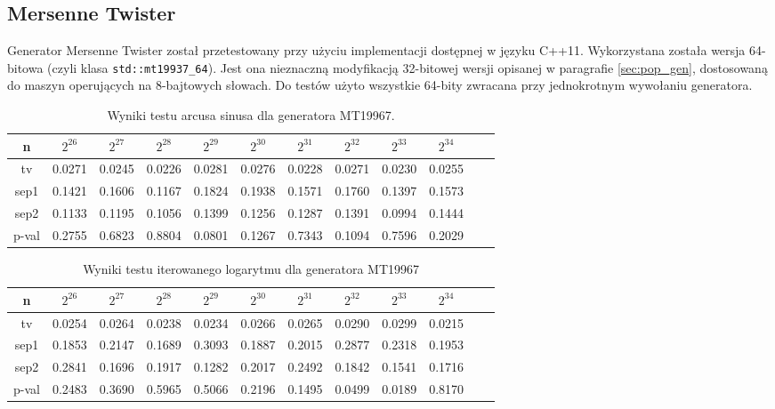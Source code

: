 \documentclass[a4paper,11pt,twoside]{book}
\theoremstyle{definition}
\begin{document}
\subsection{Mersenne Twister}
Generator Mersenne Twister został przetestowany przy użyciu implementacji dostępnej w języku C++11. Wykorzystana została wersja 64-bitowa (czyli klasa \texttt{std::mt19937\_64}). Jest ona nieznaczną modyfikacją 32-bitowej wersji opisanej w paragrafie \ref{sec:pop_gen}, dostosowaną do maszyn operujących na 8-bajtowych słowach. Do testów użyto wszystkie 64-bity zwracana przy jednokrotnym wywołaniu generatora.

\begin{table}[ht!]
\centering
 \caption{Wyniki testu arcusa sinusa dla generatora MT19967.}
 \label{tab:twister_asin}
\begin{tabular} {||c|c|c|c|c|c|c|c|c|c|c|c||}  
 \hline
     n &  $2^{26}$ &  $2^{27}$ &  $2^{28}$ &  $2^{29}$ &  $2^{30}$ &  $2^{31}$ &  $2^{32}$ &  $2^{33}$ &  $2^{34}$\\ \hline
     tv &  0.0271 &  0.0245 &  0.0226 &  0.0281 &  0.0276 &  0.0228 &  0.0271 &  0.0230 &  0.0255\\ \hline
   sep1 &  0.1421 &  0.1606 &  0.1167 &  0.1824 &  0.1938 &  0.1571 &  0.1760 &  0.1397 &  0.1573\\ \hline
   sep2 &  0.1133 &  0.1195 &  0.1056 &  0.1399 &  0.1256 &  0.1287 &  0.1391 &  0.0994 &  0.1444\\ \hline
  p-val &  0.2755 &  0.6823 &  0.8804 &  0.0801 &  0.1267 &  0.7343 &  0.1094 &  0.7596 &  0.2029\\ \hline
\end{tabular}  
\end{table}
\begin{table}[ht!]
\centering
 \caption{Wyniki testu iterowanego logarytmu dla generatora MT19967}
 \label{tab:twister_lil}
\begin{tabular} {||c|c|c|c|c|c|c|c|c|c|c|c||}  
 \hline 
     n &  $2^{26}$ &  $2^{27}$ &  $2^{28}$ &  $2^{29}$ &  $2^{30}$ &  $2^{31}$ &  $2^{32}$ &  $2^{33}$ &  $2^{34}$\\ \hline
     tv &  0.0254 &  0.0264 &  0.0238 &  0.0234 &  0.0266 &  0.0265 &  0.0290 &  0.0299 &  0.0215\\ \hline
   sep1 &  0.1853 &  0.2147 &  0.1689 &  0.3093 &  0.1887 &  0.2015 &  0.2877 &  0.2318 &  0.1953\\ \hline
   sep2 &  0.2841 &  0.1696 &  0.1917 &  0.1282 &  0.2017 &  0.2492 &  0.1842 &  0.1541 &  0.1716\\ \hline
  p-val &  0.2483 &  0.3690 &  0.5965 &  0.5066 &  0.2196 &  0.1495 &  0.0499 &  0.0189 &  0.8170\\ \hline
\end{tabular}  
\end{table}
\end{document}
